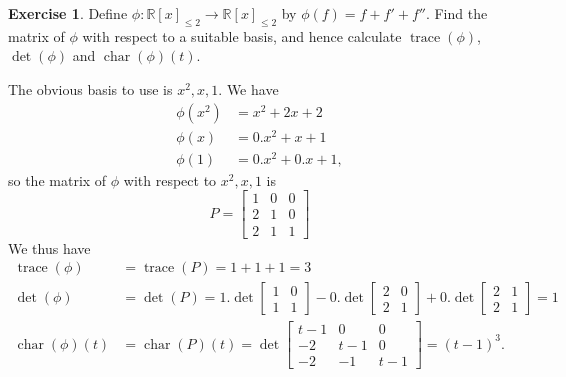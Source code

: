 \documentclass{amsart}
\newcommand{\R}         {{\mathbb{R}}}
\newcommand{\trc}       {\operatorname{trace}}
\newcommand{\chr}       {\operatorname{char}}
\newcommand{\bsm}       {\left[\begin{smallmatrix}}
\newcommand{\esm}       {\end{smallmatrix}\right]}
\renewcommand{\:}       {\colon}
\theoremstyle{definition}
\newtheorem{exercise}{Exercise}[section]
\renewenvironment{solution}{\SolutionAtEnd}{\endSolutionAtEnd}
\begin{document}
\begin{exercise}
 Define $\phi\:\R[x]_{\leq 2}\to\R[x]_{\leq 2}$ by
 $\phi(f)=f+f'+f''$.  Find the matrix of $\phi$ with respect
 to a suitable basis, and hence calculate $\trc(\phi)$,
 $\det(\phi)$ and $\chr(\phi)(t)$.
\end{exercise}
\begin{solution}
 The obvious basis to use is $x^2,x,1$.  We have 
 \begin{align*}
  \phi(x^2) &= x^2 + 2x + 2 \\ 
  \phi(x)  &= 0.x^2 + x + 1 \\
  \phi(1)  &= 0.x^2 + 0.x + 1,
 \end{align*}
 so the matrix of $\phi$ with respect to $x^2,x,1$ is
 \[ P = \bsm 1 & 0 & 0 \\ 2 & 1 & 0 \\ 2 & 1 & 1 \esm \]
 We thus have
 \begin{align*}
  \trc(\phi) &= \trc(P) = 1+1+1 = 3 \\
  \det(\phi) &= \det(P) = 1.\det\bsm 1&0\\1&1\esm  -
                          0.\det\bsm 2&0\\2&1\esm +
                          0.\det\bsm 2&1\\2&1\esm = 1\\
  \chr(\phi)(t) &= \chr(P)(t) = 
    \det\bsm t-1 & 0 & 0 \\ -2 & t-1 & 0 \\ -2 & -1 & t-1 \esm = 
    (t-1)^3.
 \end{align*}
\end{solution}
\end{document}
